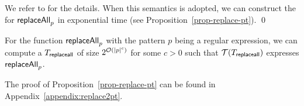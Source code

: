 \begin{example}
     We refer to \cite{CCHLW18} for the details. When this semantics is adopted, we can construct the \PPT{} for $\mathsf{replaceAll}_{p}$ in exponential time (see Proposition~\ref{prop-replace-pt}).    \qed
%    
%    
%

\end{example}


%
\begin{proposition}\label{prop-replace-pt}
    For the function $\mathsf{replaceAll}_p$ with the pattern $p$ being a regular expression, we can compute a 
    \PT{} $T_{\sf replaceall}$ of size $2^{\mathcal{O}(|p|^c)}$ for some $c > 0$ such that $\mathcal{T}(T_{\sf replaceall})$ expresses $\mathsf{replaceAll}_p$.
    \label{prop:replaceAll}
\end{proposition}
The proof of Proposition~\ref{prop-replace-pt} can be found in Appendix~\ref{appendix:replace2pt}. 



